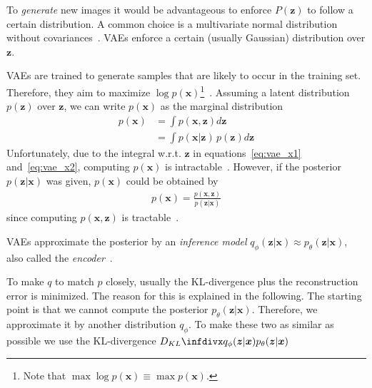 To \textit{generate} new images it would be advantageous to enforce $P(\bm{z})$ to follow a certain distribution.
A common choice is a multivariate normal distribution without covariances~\citep[pp. 24, 25]{kingma2019introduction}.
\acp{VAE} enforce a certain (usually Gaussian) distribution over $\bm{z}$.

\acp{VAE} are trained to generate samples that are likely to occur in the training set.
Therefore, they aim to maximize $\log p(\bm{x})$\footnote{Note that $\max \log  p(\bm{x}) \equiv \max  p(\bm{x})$.}~\citep[p. 18]{kingma2019introduction}.
Assuming a latent distribution $p(\bm{z})$ over $\bm{z}$, we can write $p(\bm{x})$ as the marginal distribution
\begin{align}
    p(\bm{x}) &= \int p(\bm{x}, \bm{z})d\bm{z} \label{eq:vae_x1}\\
    &= \int p(\bm{x}|\bm{z})\,p(\bm{z})d\bm{z} \label{eq:vae_x2}
\end{align}
Unfortunately, due to the integral w.r.t. $\bm{z}$ in equations~\ref{eq:vae_x1} and~\ref{eq:vae_x2}, computing $p(\bm{x})$ is intractable~\citep[p. 13]{kingma2019introduction}.
However, if the posterior $p(\bm{z}|\bm{x})$ was given, $p(\bm{x})$ could be obtained by
\begin{align}
    p(\bm{x}) = \frac{p(\bm{x}, \bm{z})}{p(\bm{z}|\bm{x})}
\end{align}
since computing $p(\bm{x}, \bm{z})$ is tractable~\citep[p. 14]{kingma2019introduction}.

\acp{VAE} approximate the posterior by an \textit{inference model} $q_\phi(\bm{z}|\bm{x}) \approx p_\theta(\bm{z}|\bm{x})$, also called the \textit{encoder}~\citep[p. 15]{kingma2019introduction}.

To make $q$ to match $p$ closely, usually the \ac{KL-divergence} plus the reconstruction error is minimized.
The reason for this is explained in the following.
The starting point is that we cannot compute the posterior $p_\theta(\bm{z}|\bm{x})$.
Therefore, we approximate it by another distribution $q_\phi$.
To make these two as similar as possible we use the \ac{KL-divergence} $\kldiv{q_\phi(\bm{z}|\bm{x})}{p_\theta(\bm{z}|\bm{x})}$

